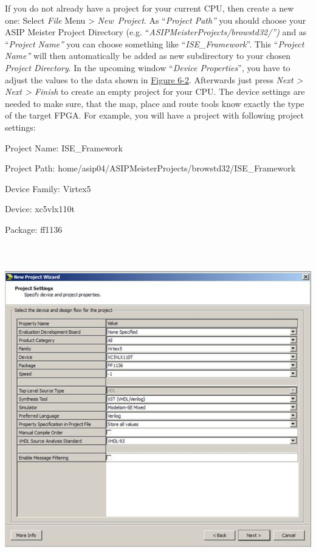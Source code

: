 \documentclass[
]{article}
\begin{document}
If you do not already have a project for your current CPU, then create a
new one: Select \emph{File} Menu \textgreater{} \emph{New~Project}. As
``\emph{Project Path''} you should choose your ASIP Meister Project
Directory (e.g. ``\emph{ASIPMeisterProjects/browstd32/'')} and as
``\emph{Project Name''} you can choose something like
``\emph{ISE\_Framework}''. This ``\emph{Project Name''} will then
automatically be added as new subdirectory to your chosen \emph{Project
Directory}. In the upcoming window ``\emph{Device Properties}'', you
have to adjust the values to the data shown in
\protect\hyperlink{Fig62}{Figure 6-2}. Afterwards just press \emph{Next
\textgreater{} Next \textgreater{} Finish} to create an empty project
for your CPU. The device settings are needed to make sure, that the map,
place and route tools know exactly the type of the target FPGA. For
example, you will have a project with following project settings:

Project Name: ISE\_Framework

Project Path: home/asip04/ASIPMeisterProjects/browstd32/ISE\_Framework

Device Family: Virtex5

Device: xc5vlx110t

Package: ff1136

\includegraphics[width=6.28333in,height=5.65694in]{6-2.png}
\end{document}
